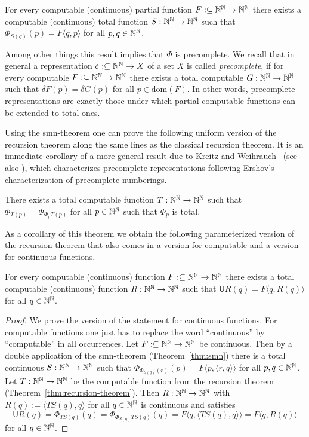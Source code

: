 \documentclass{amsart}
\def\IN{{\Bbb{N}}}
\def\In{\subseteq}
\def\U{{\mathsf{{U}}}}
\def\dom{{\mathrm{dom}}}
\begin{document}
\begin{theorem}
\label{thm:smn}
For every computable (continuous) partial function $F:\In\IN^\IN\to\IN^\IN$ there exists a computable (continuous) total function
$S:\IN^\IN\to\IN^\IN$ such that $\Phi_{S(q)}(p)=F\langle q,p\rangle$ for all $p,q\in\IN^\IN$.
\end{theorem}

Among other things this result implies that $\Phi$ is precomplete.
We recall that in general a representation $\delta:\In\IN^\IN\to X$ of a set $X$ is called {\em precomplete}, if for every computable $F:\In\IN^\IN\to\IN^\IN$ there exists a total computable $G:\IN^\IN\to\IN^\IN$ such that $\delta F(p)=\delta G(p)$ for all $p\in\dom(F)$. In other words, precomplete representations are exactly those under which partial computable functions can be extended to total ones. 

Using the smn-theorem one can prove the following uniform version of the recursion theorem along the same lines as the classical recursion theorem.
It is an immediate corollary of a more general result due to Kreitz and Weihrauch~\cite[Theorem~3.4]{KW85}  (see also \cite[Theorem~3.3.20]{Wei87}), which characterizes precomplete
representations following Ershov's characterization of precomplete numberings.

\begin{theorem}
\label{thm:recursion-theorem}
There exists a total computable function $T:\IN^\IN\to\IN^\IN$ such that 
$\Phi_{T(p)}=\Phi_{\Phi_pT(p)}$
for all $p\in\IN^\IN$ such that $\Phi_p$ is total.
\end{theorem}

As a corollary of this theorem we obtain the following parameterized version of the recursion theorem that also comes in a version for computable and a version for continuous functions.

\begin{corollary}
\label{cor:recursion-theorem}
For every computable (continuous) function $F:\In\IN^\IN\to\IN^\IN$ there exists a total computable (continuous) function $R:\IN^\IN\to\IN^\IN$ such that
$\U R(q)=F\langle q,R(q)\rangle$ for all $q\in\IN^\IN$.
\end{corollary}
\begin{proof}
We prove the version of the statement for continuous functions. For computable functions one just has to replace the word ``continuous'' by ``computable'' in all occurrences.
Let $F:\In\IN^\IN\to\IN^\IN$ be continuous. Then by a double application of the smn-theorem (Theorem~\ref{thm:smn}) there is a total continuous $S:\IN^\IN\to\IN^\IN$ such that
$\Phi_{\Phi_{S(q)}(r)}(p)=F\langle p,\langle r,q\rangle\rangle$ for all $p,q\in\IN^\IN$. Let $T:\IN^\IN\to\IN^\IN$ be the computable function from the
recursion theorem (Theorem~\ref{thm:recursion-theorem}). Then $R:\IN^\IN\to\IN^\IN$ with $R(q):=\langle TS(q),q\rangle$ for all $q\in\IN^\IN$ is continuous
and satisfies
\[\U R(q)=\Phi_{TS(q)}(q)=\Phi_{\Phi_{S(q)}TS(q)}(q)=F\langle q,\langle TS(q),q\rangle\rangle=F\langle q,R(q)\rangle\] 
for all $q\in\IN^\IN$.
\end{proof}
\end{document}
